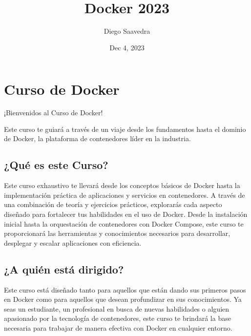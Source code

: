 \documentclass[
  a4paper,
  DIV=11,
  numbers=noendperiod,
  onepage,
  openany]{scrreprt}
\title{Docker 2023}
\author{Diego Saavedra}
\date{Dec 4, 2023}
\renewcommand*\contentsname{Table of contents}
\newcommand\contentsname{Table of contents}
\begin{document}
\maketitle
\ifdefined\Shaded\renewenvironment{Shaded}{\begin{tcolorbox}[enhanced, boxrule=0pt, breakable, interior hidden, frame hidden, sharp corners, borderline west={3pt}{0pt}{shadecolor}]}{\end{tcolorbox}}\fi

\renewcommand*\contentsname{Table of contents}
{
\hypersetup{linkcolor=}
\setcounter{tocdepth}{2}
\tableofcontents
}

\hypertarget{curso-de-docker}{%
\chapter{Curso de Docker}\label{curso-de-docker}}

¡Bienvenidos al Curso de Docker!

Este curso te guiará a través de un viaje desde los fundamentos hasta el
dominio de Docker, la plataforma de contenedores líder en la industria.

\hypertarget{quuxe9-es-este-curso}{%
\section{¿Qué es este Curso?}\label{quuxe9-es-este-curso}}

Este curso exhaustivo te llevará desde los conceptos básicos de Docker
hasta la implementación práctica de aplicaciones y servicios en
contenedores. A través de una combinación de teoría y ejercicios
prácticos, explorarás cada aspecto diseñado para fortalecer tus
habilidades en el uso de Docker. Desde la instalación inicial hasta la
orquestación de contenedores con Docker Compose, este curso te
proporcionará las herramientas y conocimientos necesarios para
desarrollar, desplegar y escalar aplicaciones con eficiencia.

\hypertarget{a-quiuxe9n-estuxe1-dirigido}{%
\section{¿A quién está dirigido?}\label{a-quiuxe9n-estuxe1-dirigido}}

Este curso está diseñado tanto para aquellos que están dando sus
primeros pasos en Docker como para aquellos que desean profundizar en
sus conocimientos. Ya seas un estudiante, un profesional en busca de
nuevas habilidades o alguien apasionado por la tecnología de
contenedores, este curso te brindará la base necesaria para trabajar de
manera efectiva con Docker en cualquier entorno.
\end{document}
